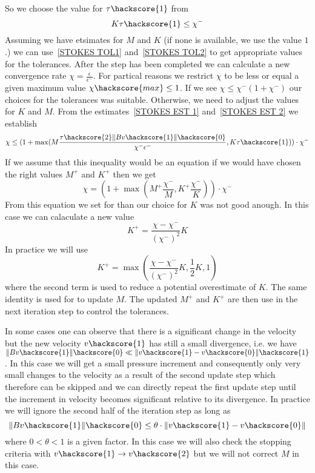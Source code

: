 So we choose the value for $\tau\hackscore{1}$ from
\begin{equation} \label{STOKES TOL1}
K \tau\hackscore{1} \le \chi^{-}
\end{equation}
Assuming we have etsimates for $M$ and $K$ (if none is available, we use the value $1$.)
we can use~\ref{STOKES TOL1} and~\ref{STOKES TOL2} to get appropriate values for the tolerances. After
the step has been completed we can calculate a new convergence rate $\chi =\frac{\epsilon}{\epsilon^{-}}$. 
For partical reasons we restrict $\chi$ to be less or equal a given maximum value $\chi\hackscore{max}\le 1$.
If we see $\chi \le \chi^{-} (1+\chi^{-})$ our choices for the tolerances was suitable. Otherwise, we need to adjust the values for $K$ and $M$. From the estimates~\ref{STOKES EST 1} and~\ref{STOKES EST 2} we establish
\begin{equation}\label{STOKES EST 3}
\chi \le ( 1 + \max(M \frac{\tau\hackscore{2} \|B v\hackscore{1}\|\hackscore{0}}{\chi^{-} \epsilon^{-}},K \tau\hackscore{1}  ) ) \cdot \chi^{-} 
\end{equation}
If we assume that this inequality would be an equation if we would have chosen the right values
$M^{+}$ and $K^{+}$ then we get 
\begin{equation}\label{STOKES EST 3b}
\chi =  ( 1 + \max(M^{+} \frac{\chi^{-}}{M},K^{+} \frac{\chi^{-}}{K}) ) \cdot \chi^{-} 
\end{equation}
From this equation we set for 
than our choice for $K$ was not good anough. In this case we can calaculate a new value
 \begin{equation}
K^{+} =  \frac{\chi-\chi^{-}}{(\chi^{-})^2} K
\end{equation}
In practice we will use 
 \begin{equation}
K^{+}  = \max(\frac{\chi-\chi^{-}}{(\chi^{-})^2} K,\frac{1}{2}K,1)
\end{equation}
where the second term is used to reduce a potential overestimate of $K$.  
The same identity is used for to update $M$. The updated $M^{+}$ and $K^{+}$ 
are then use in the next iteration step to control the tolerances. 

In some cases one can observe that there is a significant change 
in the velocity but the new velocity $v\hackscore{1}$ has still a 
small divergence, i.e. we have
$\|Bv\hackscore{1}\|\hackscore{0} \ll \|v\hackscore{1}-v\hackscore{0}\|\hackscore{1}$. 
In this case we will get a small pressure increment and consequently only very small changes to
the velocity as a result of the second update step which therefore can be skipped and
we can directly repeat the first update step until the increment in velocity becomes
significant relative to its divergence. In practice we will ignore the second half of the iteration step
as long as 
 \begin{equation}\label{STOKES LARGE BV1}
\|Bv\hackscore{1}\|\hackscore{0} \le \theta \cdot \|v\hackscore{1}-v\hackscore{0}\| 
\end{equation}
where $0<\theta<1$ is a given factor. In this case we will also check the stopping criteria 
with $v\hackscore{1}\rightarrow v\hackscore{2}$ but we will not correct $M$ in this case.

